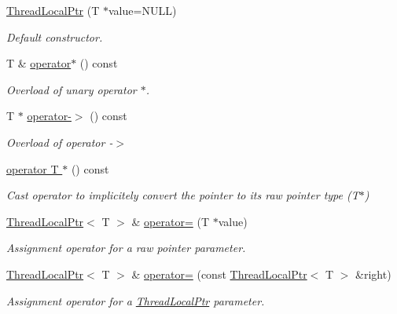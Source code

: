 \begin{DoxyCompactItemize}
\item 
\hyperlink{classsf_1_1_thread_local_ptr_a8c678211d7828d2a8c41cb534422d649}{Thread\+Local\+Ptr} (T $\ast$value=N\+U\+L\+L)
\begin{DoxyCompactList}\small\item\em Default constructor. \end{DoxyCompactList}\item 
T \& \hyperlink{classsf_1_1_thread_local_ptr_aa3bac9a08e8739613961659d10e0fadd}{operator$\ast$} () const 
\begin{DoxyCompactList}\small\item\em Overload of unary operator $\ast$. \end{DoxyCompactList}\item 
T $\ast$ \hyperlink{classsf_1_1_thread_local_ptr_aa0b559f78929b22cb2585cb2966edfb2}{operator-\/$>$} () const 
\begin{DoxyCompactList}\small\item\em Overload of operator -\/$>$ \end{DoxyCompactList}\item 
\hyperlink{classsf_1_1_thread_local_ptr_ab4a6a341c26b58f0ed3ef86502bd9572}{operator T $\ast$} () const 
\begin{DoxyCompactList}\small\item\em Cast operator to implicitely convert the pointer to its raw pointer type (T$\ast$) \end{DoxyCompactList}\item 
\hyperlink{classsf_1_1_thread_local_ptr}{Thread\+Local\+Ptr}$<$ T $>$ \& \hyperlink{classsf_1_1_thread_local_ptr_a14dcf1cdf5f6b3bcdd633014b2b671f5}{operator=} (T $\ast$value)
\begin{DoxyCompactList}\small\item\em Assignment operator for a raw pointer parameter. \end{DoxyCompactList}\item 
\hyperlink{classsf_1_1_thread_local_ptr}{Thread\+Local\+Ptr}$<$ T $>$ \& \hyperlink{classsf_1_1_thread_local_ptr_a6792a6a808af06f0d13e3ceecf2fc947}{operator=} (const \hyperlink{classsf_1_1_thread_local_ptr}{Thread\+Local\+Ptr}$<$ T $>$ \&right)
\begin{DoxyCompactList}\small\item\em Assignment operator for a \hyperlink{classsf_1_1_thread_local_ptr}{Thread\+Local\+Ptr} parameter. \end{DoxyCompactList}\end{DoxyCompactItemize}


